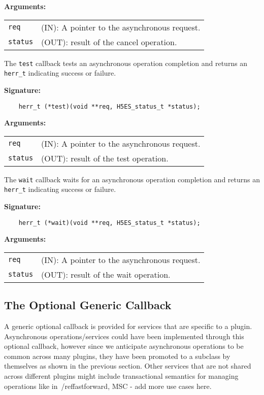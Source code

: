 \textbf{Arguments:}\\
\begin{tabular}{l p{10cm}}
  {\tt req} & (IN): A pointer to the asynchronous request.\\
  {\tt status} & (OUT): result of the cancel operation.\\
\end{tabular}

The {\tt test} callback tests an asynchronous operation completion
and returns an {\tt herr\_t} indicating success or failure.

\textbf{Signature:}
\begin{lstlisting}
    herr_t (*test)(void **req, H5ES_status_t *status);
\end{lstlisting}

\textbf{Arguments:}\\
\begin{tabular}{l p{10cm}}
  {\tt req} & (IN): A pointer to the asynchronous request.\\
  {\tt status} & (OUT): result of the test operation.\\
\end{tabular}

The {\tt wait} callback waits for an asynchronous operation completion
and returns an {\tt herr\_t} indicating success or failure.

\textbf{Signature:}
\begin{lstlisting}
    herr_t (*wait)(void **req, H5ES_status_t *status);
\end{lstlisting}

\textbf{Arguments:}\\
\begin{tabular}{l p{10cm}}
  {\tt req} & (IN): A pointer to the asynchronous request.\\
  {\tt status} & (OUT): result of the wait operation.\\
\end{tabular}

\subsection{The Optional Generic Callback}
A generic optional callback is provided for services that are specific to a plugin. Asynchronous operations/services could have been implemented through this optional callback, however since we anticipate asynchronous operations to be common across many plugins, they have been promoted to a subclass by themselves as shown in the previous section. Other services that are not shared across different plugins might include transactional semantics for managing operations like in~/ref{fastforward}, MSC - add more use cases here.

